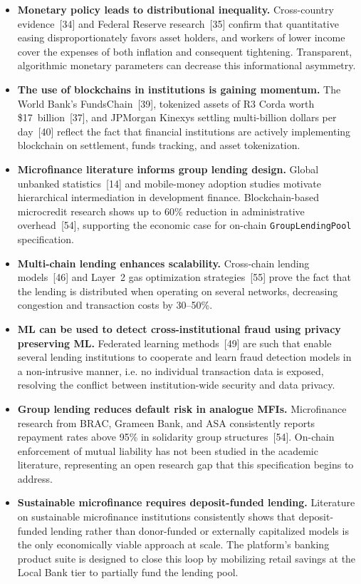 \documentclass[12pt,a4paper]{report}
\begin{document}
\begin{itemize}[noitemsep]
\item \textbf{Monetary policy leads to distributional inequality.} Cross-country evidence~[34] and Federal Reserve research~[35] confirm that quantitative easing disproportionately favors asset holders, and workers of lower income cover the expenses of both inflation and consequent tightening. Transparent, algorithmic monetary parameters can decrease this informational asymmetry.
\item \textbf{The use of blockchains in institutions is gaining momentum.} The World Bank's FundsChain~[39], tokenized assets of R3 Corda worth \$17~billion~[37], and JPMorgan Kinexys settling multi-billion dollars per day~[40] reflect the fact that financial institutions are actively implementing blockchain on settlement, funds tracking, and asset tokenization.
\item \textbf{Microfinance literature informs group lending design.} Global unbanked statistics~[14] and mobile-money adoption studies motivate hierarchical intermediation in development finance. Blockchain-based microcredit research shows up to 60\% reduction in administrative overhead~[54], supporting the economic case for on-chain \texttt{GroupLendingPool} specification.
\item \textbf{Multi-chain lending enhances scalability.} Cross-chain lending models~[46] and Layer~2 gas optimization strategies~[55] prove the fact that the lending is distributed when operating on several networks, decreasing congestion and transaction costs by 30--50\%.
\item \textbf{ML can be used to detect cross-institutional fraud using privacy preserving ML.} Federated learning methods~[49] are such that enable several lending institutions to cooperate and learn fraud detection models in a non-intrusive manner, i.e. no individual transaction data is exposed, resolving the conflict between institution-wide security and data privacy.

\item \textbf{Group lending reduces default risk in analogue MFIs.} Microfinance research from BRAC, Grameen Bank, and ASA consistently reports repayment rates above 95\% in solidarity group structures~[54]. On-chain enforcement of mutual liability has not been studied in the academic literature, representing an open research gap that this specification begins to address.

\item \textbf{Sustainable microfinance requires deposit-funded lending.} Literature on sustainable microfinance institutions consistently shows that deposit-funded lending rather than donor-funded or externally capitalized models is the only economically viable approach at scale. The platform's banking product suite is designed to close this loop by mobilizing retail savings at the Local Bank tier to partially fund the lending pool.
\end{itemize}
\end{document}
